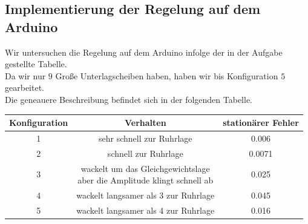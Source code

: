 \documentclass{article}
\begin{document}
\subsection{Implementierung der Regelung auf dem Arduino}
Wir untersuchen die Regelung auf dem Arduino infolge der in der Aufgabe gestellte Tabelle.\\
Da wir nur $9$ Große Unterlagscheiben haben, haben wir bis Konfiguration $5$ gearbeitet. \\
Die geneauere Beschreibung befindet sich in der folgenden Tabelle. \\
\begin{center}
  \begin{tabular}{ |c|c|c|}
    \hline
    Konfiguration & Verhalten & stationärer Fehler \\
    \hline
    1 & sehr schnell zur Ruhrlage & 0.006 \\
    \hline
    2 & schnell zur Ruhrlage & 0.0071 \\
    \hline
    3 &  \shortstack{wackelt um das Gleichgewichtslage \\ aber die Amplitude klingt schnell ab} & 0.025 \\
    \hline
    4 & wackelt langsamer als 3 zur Ruhrlage & 0.045 \\
    \hline
    5 & wackelt langsamer als 4 zur Ruhrlage & 0.016 \\
    \hline
  \end{tabular}
\end{center}
\end{document}
